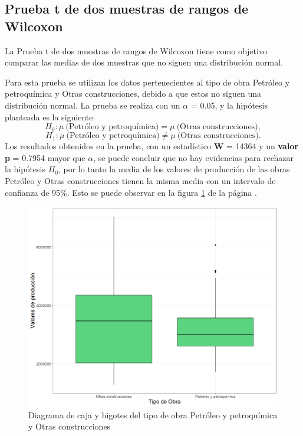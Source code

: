 \documentclass{article}
\begin{document}
\subsection{Prueba t de dos muestras de rangos de Wilcoxon}
La Prueba t de dos muestras de rangos de Wilcoxon tiene como objetivo comparar las medias de dos muestras que no siguen una distribución normal. 

Para esta prueba se utilizan los datos pertenecientes al tipo de obra Petróleo y petroquímica y Otras construcciones, debido a que estos no siguen una distribución normal. La prueba se realiza con un $\alpha$ = 0.05, y la hipótesis planteada es la siguiente: 
\begin{equation}\label{eq:1}
H_{0}:\mu\:\text{(Petróleo y petroquímica)} = \mu\:\text{(Otras construcciones)},    
\end{equation}
\begin{equation}\label{eq:2}
 H_{1}:\mu\:\text{(Petróleo y petroquímica)} \neq \mu\:\text{(Otras construcciones)}. 
\end{equation}
Los resultados obtenidos en la prueba, con un estadístico \textbf{W} = 14364 y un \textbf{valor p} = 0.7954 mayor que $\alpha$, se puede concluir que no hay evidencias para rechazar la hipótesis $H_{0}$, por lo tanto la media de los valores de producción de las obras Petróleo y Otras construcciones tienen la misma media con un intervalo de confianza de 95\%. Esto se puede observar en la figura \ref{fig:9} de la página \pageref{fig:9}.

\begin{figure}
\centering
\includegraphics[scale=0.50]{figuras/WilDoble.png}
\caption{Diagrama de caja y bigotes del tipo de obra Petróleo y petroquímica y Otras construcciones}
\label{fig:9}
\end{figure}
\end{document}
